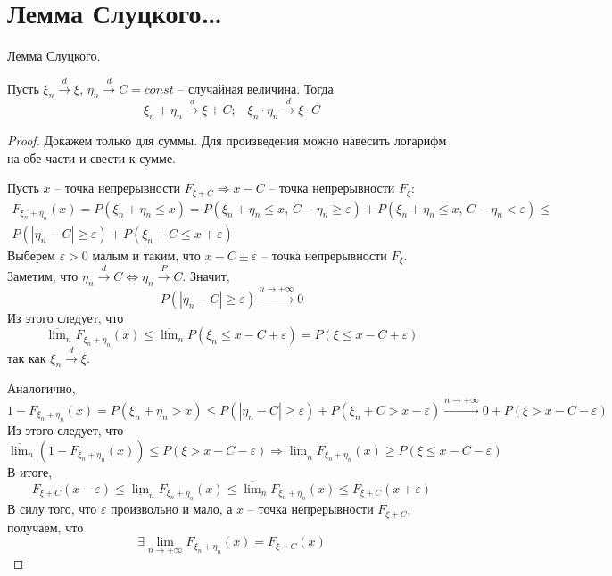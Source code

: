 \section{Лемма Слуцкого\dots}
\begin{theorem}
	Лемма Слуцкого.

	Пусть $\xi_n \stackrel{d}{\to} \xi,\, \eta_n \stackrel{d}{\to} C = const$ -- случайная величина. Тогда
	\[\xi_n + \eta_n \stackrel{d}{\to} \xi + C;\;\;\; \xi_n\cdot\eta_n \stackrel{d}{\to} \xi\cdot C\]
\end{theorem}

\begin{proof}
	Докажем только для суммы. Для произведения можно навесить логарифм на обе части и свести к сумме.

	Пусть $x$ -- точка непрерывности $F_{\xi + C} \Rightarrow x - C$ -- точка непрерывности $F_\xi$:
	\begin{align*}
		F_{\xi_n + \eta_n}(x) = P(\xi_n + \eta_n \leq x) = P(\xi_n + \eta_n \leq x,\, C - \eta_n \geq \varepsilon) + P(\xi_n + \eta_n \leq x,\, C - \eta_n < \varepsilon) \leq \\
		P(|\eta_n - C| \geq \varepsilon) + P(\xi_n + C \leq x + \varepsilon)
	\end{align*}
	Выберем $\varepsilon > 0$ малым и таким, что $x - C \pm \varepsilon$ -- точка непрерывности $F_\xi$. Заметим, что $\eta_n \stackrel{d}{\to} C \Leftrightarrow \eta_n \stackrel{P}{\to} C$. Значит,
	\[P(|\eta_n - C| \geq \varepsilon) \stackrel{n \to +\infty}{\to} 0\]
	Из этого следует, что
	\[\overline{\lim}_n F_{\xi_n + \eta_n}(x) \leq \overline{\lim}_n P(\xi_n \leq x - C + \varepsilon) = P(\xi \leq x - C + \varepsilon)\]
	так как $\xi_n \stackrel{d}{\to} \xi$.

	Аналогично,
	\[1 - F_{\xi_n + \eta_n}(x) = P(\xi_n + \eta_n > x) \leq P(|\eta_n - C| \geq \varepsilon) + P(\xi_n + C > x - \varepsilon) \stackrel{n \to +\infty}{\to} 0 + P(\xi > x - C - \varepsilon)\]
	Из этого следует, что
	\[\overline{\lim}_n(1 - F_{\xi_n + \eta_n}(x)) \leq P(\xi > x - C - \varepsilon) \Rightarrow \underline{\lim}_n F_{\xi_n + \eta_n}(x) \geq P(\xi \leq x - C - \varepsilon)\]
	В итоге,
	\[F_{\xi + C}(x - \varepsilon) \leq \underline{\lim}_nF_{\xi_n + \eta_n}(x) \leq \overline{\lim}_n F_{\xi_n + \eta_n}(x) \leq F_{\xi + C}(x + \varepsilon)\]
	В силу того, что $\varepsilon$ произвольно и мало, а $x$ -- точка непрерывности $F_{\xi + C}$, получаем, что
	\[\exists \lim_{n \to +\infty}F_{\xi_n + \eta_n}(x) = F_{\xi + C}(x)\]
\end{proof}

